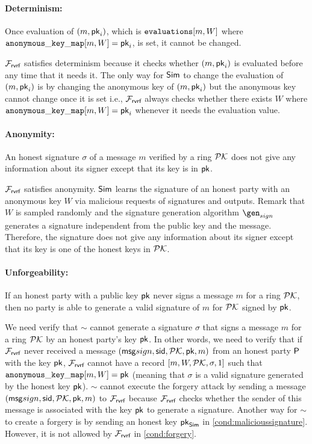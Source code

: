 \paragraph{Determinism:} Once evaluation of $ (m, \mathsf{pk}_i) $, which is $ \texttt{evaluations}[m,W] $ where $ \mathtt{anonymous\_key\_map}[m,W] = \mathsf{pk}_i $, is set, it cannot be changed. 

$ \mathcal{F}_{\textsf{rvrf}} $ satisfies determinism because it checks whether $ (m, \mathsf{pk}_i) $ is evaluated before any time that it needs it. The only way for $ \mathsf{Sim} $ to change the evaluation of $ (m, \mathsf{pk}_i) $ is by changing the anonymous key of $ (m, \mathsf{pk}_i)  $ but the anonymous key cannot change once it is set i.e., $ \mathcal{F}_{\textsf{rvrf}} $ always checks whether there exists $ W $ where $ \mathtt{anonymous\_key\_map}[m,W]  = \mathsf{pk}_i$ whenever it needs the evaluation value.

\paragraph{Anonymity:} An honest signature $ \sigma $ of a message $ m $ verified by a ring $ {\mathcal{PK}} $ does not give any information about its signer except that its key is in $ \mathsf{pk} $.

$ \mathcal{F}_{\textsf{rvrf}} $ satisfies anonymity. $ \mathsf{Sim} $ learns the signature of an honest party with an anonymous key $ W $ via malicious requests of signatures and outputs. Remark that $ W $ is sampled randomly and the signature generation algorithm $ \gen_{sign} $ generates a signature independent from the public key and the message. Therefore, the signature does not give any information about its signer except that its key is one of the honest keys in  $ {\mathcal{PK}}  $.

\paragraph{Unforgeability:}  If an honest party with a public key $ \mathsf{pk} $ never signs a message $ m $ for a ring $ {\mathcal{PK}} $, then no party is able to generate a valid signature of $ m $ for $ {\mathcal{PK}} $ signed by $ \mathsf{pk} $. 

We need verify that $ \sim $ cannot generate a signature $ \sigma $ that signs a message $ m $ for a ring $ {\mathcal{PK}} $ by an honest party's key $ \mathsf{pk} $. In other words, we need to verify that if $ \mathcal{F}_{\textsf{rvrf}} $ never received a message $ (\mathsf{msg}{sign}, \textsf{sid},{\mathcal{PK}},\mathsf{pk},m) $ from an honest party $ \mathsf{P} $ with the key $ \mathsf{pk} $, $ \mathcal{F}_{\textsf{rvrf}} $ cannot have a record $ [m, W, {\mathcal{PK}}, \sigma, 1] $ such that $ \mathtt{anonymous\_key\_map}[m,W]  = \mathsf{pk}$ (meaning that $ \sigma $ is a valid signature generated by the honest key $ \mathsf{pk} $). 
$ \sim $ cannot execute the forgery attack by sending a message $ (\mathsf{msg}{sign}, \textsf{sid},{\mathcal{PK}},\mathsf{pk},m) $ to $ \mathcal{F}_{\textsf{rvrf}} $ because $ \mathcal{F}_{\textsf{rvrf}} $ checks whether the sender of this message is associated with the key $ \mathsf{pk} $ to generate a signature. Another way for $ \sim $ to create a forgery is by sending an honest key $ \mathsf{pk}_{\mathsf{Sim}} $  in \ref{cond:malicioussignature}. However, it is not allowed by $ \mathcal{F}_{\textsf{rvrf}} $ in \ref{cond:forgery}.


